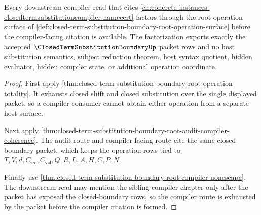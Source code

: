 \begin{theorem}
\label{thm:closed-term-substitution-boundary-root-compiler-route-exhaustion}
Every downstream compiler read that cites \autoref{ch:concrete-instances-closedtermsubstitutioncompiler-namecert} factors through the root operation surface of \autoref{def:closed-term-substitution-boundary-root-operation-surface} before the compiler-facing citation is available. The factorization exports exactly the accepted $\ClosedTermSubstitutionBoundaryUp$ packet rows and no host substitution semantics, subject reduction theorem, host syntax quotient, hidden evaluator, hidden compiler state, or additional operation coordinate.
\end{theorem}
\begin{proof}
First apply \autoref{thm:closed-term-substitution-boundary-root-operation-totality}. It exhausts closed shift and closed substitution over the single displayed packet, so a compiler consumer cannot obtain either operation from a separate host surface.

Next apply \autoref{thm:closed-term-substitution-boundary-root-audit-compiler-coherence}. The audit route and compiler-facing route cite the same closed-boundary packet, which keeps the operation rows tied to $T,V,d,C_{\mathsf{src}},C_{\mathsf{val}},Q,R,L,A,H,C,P,N$.

Finally use \autoref{thm:closed-term-substitution-boundary-root-compiler-nonescape}. The downstream read may mention the sibling compiler chapter only after the packet has exposed the closed-boundary rows, so the compiler route is exhausted by the packet before the compiler citation is formed.
\end{proof}

